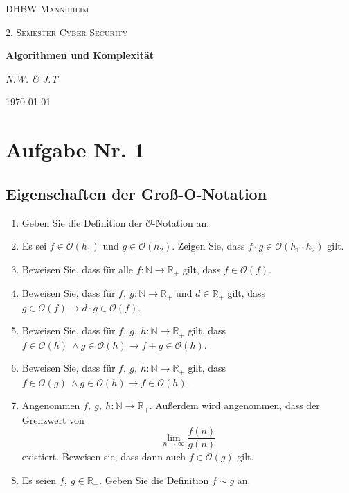 \documentclass[12px,a4paper]{article}
\begin{document}
\begin{titlepage}
	\centering
	{\scshape\LARGE DHBW Mannhheim \par}
	\vspace{1cm}
	{\scshape\Large 2. Semester Cyber Security\par}
	\vspace{1.5cm}
	{\huge\bfseries Algorithmen und Komplexität\par}
	\vspace{2cm}
	{\Large\itshape N.W. \& J.T\par}
	\vfill

	{\large \today\par} 
\end{titlepage}
\newpage
\justify

\section*{Aufgabe Nr. 1}
\subsection*{Eigenschaften der Groß-O-Notation}
\begin{enumerate}
	\item Geben Sie die Definition der $\mathcal{O}$-Notation an.
	\item Es sei $f \in \mathcal{O}(h_1)$ und $g \in \mathcal{O}(h_2)$. Zeigen Sie, dass $f \cdot g \in \mathcal{O}(h_1 \cdot h_2)$ gilt.
	\item Beweisen Sie, dass für alle $f: \mathbb{N} \rightarrow \mathbb{R}_+$ gilt, dass $f \in \mathcal{O}(f)$.
	\item Beweisen Sie, dass für $f, \: g: \mathbb{N} \rightarrow \mathbb{R}_+$ und $d \in \mathbb{R}_+$ gilt, dass \\ \noindent\hspace*{5mm} $g \in \mathcal{O}(f) \rightarrow d \cdot g \in \mathcal{O}(f)$.
	\item Beweisen Sie, dass für $f, \: g, \: h: \mathbb{N} \rightarrow \mathbb{R}_+$ gilt, dass \\ \noindent\hspace*{5mm} $f \in \mathcal{O}(h) \ \land g \in \mathcal{O}(h) \rightarrow f+g \in \mathcal{O}(h)$.
	\item Beweisen Sie, dass für $f, \: g, \: h: \mathbb{N} \rightarrow \mathbb{R}_+$ gilt, dass \\ \noindent\hspace*{5mm} $f \in \mathcal{O}(g) \ \land g \in \mathcal{O}(h) \rightarrow f \in \mathcal{O}(h)$.
	\item Angenommen $f, \: g, \: h: \mathbb{N} \rightarrow \mathbb{R}_+$. Außerdem wird angenommen, dass der Grenzwert von  \noindent\hspace*{5mm}  $$\lim\limits_{n \rightarrow \infty} \frac{f(n)}{g(n)}$$ existiert. Beweisen sie, dass dann auch $f \in \mathcal{O}(g)$ gilt.
	\item Es seien $f, \: g \in \mathbb{R}_+$. Geben Sie die Definition $f \sim g$ an.
\end{enumerate}
\end{document}

